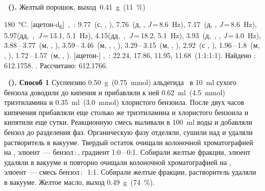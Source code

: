\textbf{~().}
Желтый порошок, выход~\SI{0.41}{\gram}~(\SI{11}{\percent})
\begin{experimental}[]
     \SI{180}{\celsius}.
    [ацетон­-d\textsubscript{6}]~\chemdelta{},~\si{\ppm}: 9.77~(с, , ), 7.76~(д, , \textit{J}\,=\,8.6~\si{\hertz}), 7.17~(д, , \textit{J}\,=\,8.6~\si{\hertz}), 5.97(дд,~,~\textit{J}\,=\,13.1, 5.1~\si{\hertz}), 4.15(дд,~,~\textit{J}\,=\,18.2, 5.1~\si{\hertz}), 3.93~(д,~, , \textit{J}\,=\,4.0~\si{\hertz}), 3.88\,--\,3.77~(м, , ), 3.59\,--\,3.46~(м, , , ), 3.29\,--\,3.15~(м, , ), 2.92~(с , ), 1.96\,--\,1.8~(м, , ), 1.72\,--\,1.57~(м, , ).
    [ацетон-] \chemdelta,~\si{\ppm}: 22.24, 17.86, 11.95, 11.68~(1:1:1:1).
     Найдено \ce{[M+]}: \num{612.1758}. . Рассчитано:  \num{612.1766}.
\end{experimental}


\textbf{~().} \textbf{Способ 1} Суспензию \SI{0.50}{\gram}~(\SI{0.75}{\mmol}) альдегида~\textbf{} в \SI{10}{\milli\litre} сухого бензола доводили до кипения и прибавляли к ней \SI{0.62}{\milli\litre}~(\SI{4.5}{\mmol}) триэтиламина и \SI{0.35}{\milli\litre}~(\SI{3.0}{\mmol}) хлористого бензоила. После двух часов кипячения прибавляли еще столько же триэтиламина и хлористого бензоила и кипятили еще сутки. Реакционную смесь выливали в \SI{100}{\milli\litre} воды и добавляли бензол до разделения фаз. Органическую фазу отделяли, сушили над  и удаляли растворитель в вакууме. Твердый остаток очищали колоночной хроматографией на , элюент~--- бензол\,:\,, градиент 1:0\,--\,0:1. Собирали желтые фракции, элюент удаляли в вакууме и повторно очищали колоночной хроматографией на , элюент~--- смесь бензол\,:\,~1:1. Собирали желтые фракции, растворитель удаляли в вакууме. Желтое масло, выход \SI{0.49}{\gram}~(\SI{74}{\percent}).

